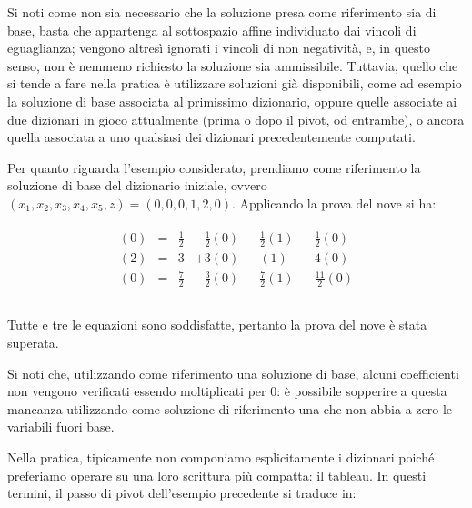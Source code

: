 \documentclass{article}
\begin{document}
  	Si noti come non sia necessario che la soluzione presa come riferimento sia di base, basta che appartenga al sottospazio affine individuato dai vincoli di eguaglianza; vengono altresì ignorati i vincoli di non negativit\`a, e, in questo senso, non \`e nemmeno richiesto la soluzione sia ammissibile.
    Tuttavia, quello che si tende a fare nella pratica è utilizzare soluzioni già disponibili, come ad esempio la soluzione di base associata al primissimo dizionario, oppure quelle associate ai due dizionari in gioco attualmente (prima o dopo il pivot, od entrambe), o ancora quella associata a uno qualsiasi dei dizionari precedentemente computati. 
  	
  	Per quanto riguarda l'esempio considerato, prendiamo come riferimento la soluzione di base del dizionario iniziale, ovvero $(x_1,x_2,x_3,x_4,x_5,z)=(0,0,0,1,2,0)$. Applicando la prova del nove si ha:
  	
	\[
		\begin{array}{c}
			\begin{array}{lcrrrr}
				(0) &=& \frac{1}{2} & -\frac{1}{2}(0) & -\frac{1}{2}(1) & -\frac{1}{2}(0) \\
				(2) &=& 3 & +3(0) & -(1) & -4(0) \\
				(0)    &=& \frac{7}{2} & -\frac{3}{2}(0) & -\frac{7}{2}(1) & -\frac{11}{2}(0) \\
			\end{array}\\		
		\end{array}
	\]
	 
	Tutte e tre le equazioni sono soddisfatte, pertanto la prova del nove è stata superata.
	
	Si noti che, utilizzando come riferimento una soluzione di base, alcuni coefficienti non vengono verificati essendo moltiplicati per $0$: è possibile sopperire a questa mancanza utilizzando come soluzione di riferimento una che non abbia a zero le variabili fuori base.
 	
  	Nella pratica, tipicamente non componiamo esplicitamente i dizionari poiché preferiamo operare su una loro scrittura più compatta: il tableau. In questi termini, il passo di pivot dell'esempio precedente si traduce in:
  	
\end{document}
